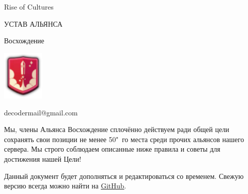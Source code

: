 \documentclass[utf8, 14pt]{roc-class}
\begin{document}
    
    {
        \fancyhead{}
        \fancyfoot{}
        \fancyhead{}
    }
    
    \thispagestyle{firststyle}
    
    \vspace*{\fill}
    \begin{center}
        \Huge
        
        Rise of Cultures
        
        \bigskip
        
        УСТАВ АЛЬЯНСА
        
        Восхождение
        
        \includegraphics[width=2cm]{logo}
    \end{center}
    \vspace*{\fill}
    \begin{center}
        decodermail@gmail.com
    \end{center}

    \newpage
    
    {
        \hypersetup{linkcolor=black}
        \tableofcontents
    }
    
    \newpage
    
    Мы, члены Альянса Восхождение сплочённо действуем ради общей цели сохранять свои позиции не менее 50"~го места среди прочих альянсов нашего сервера.
    Мы строго соблюдаем описанные ниже правила и советы для достижения нашей Цели!
    
    \bigskip
    
    Данный документ будет дополняться и редактироваться со временем.
    Свежую версию всегда можно найти на \underline{\href{https://github.com/decodergit/RoC-BlackDragon}{GitHub}}.
    
    
    
    
    
    
    
\end{document}
